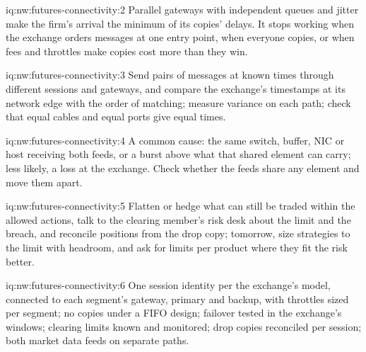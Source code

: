 \begin{solution}{iq:nw:futures-connectivity:2}
Parallel gateways with independent queues and jitter make the firm's arrival the minimum of its copies' delays. It stops working
when the exchange orders messages at one entry point, when everyone copies, or when fees and throttles make copies cost more than
they win.
\end{solution}

\begin{solution}{iq:nw:futures-connectivity:3}
Send pairs of messages at known times through different sessions and gateways, and compare the exchange's timestamps at its network
edge with the order of matching; measure variance on each path; check that equal cables and equal ports give equal times.
\end{solution}

\begin{solution}{iq:nw:futures-connectivity:4}
A common cause: the same switch, buffer, NIC or host receiving both feeds, or a burst above what that shared element can carry; less
likely, a loss at the exchange. Check whether the feeds share any element and move them apart.
\end{solution}

\begin{solution}{iq:nw:futures-connectivity:5}
Flatten or hedge what can still be traded within the allowed actions, talk to the clearing member's risk desk about the limit and
the breach, and reconcile positions from the drop copy; tomorrow, size strategies to the limit with headroom, and ask for limits
per product where they fit the risk better.
\end{solution}

\begin{solution}{iq:nw:futures-connectivity:6}
One session identity per the exchange's model, connected to each segment's gateway, primary and backup, with throttles sized per
segment; no copies under a FIFO design; failover tested in the exchange's windows; clearing limits known and monitored; drop copies
reconciled per session; both market data feeds on separate paths.
\end{solution}

